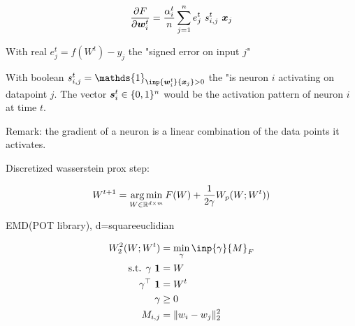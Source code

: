 \begin{equation}
	\frac{\partial F}{\partial {\bm{w}}^t_i} = \frac{\alpha^t_i}{n} \sum_{j=1}^{n} e^t_j ~ s^t_{i, j} ~ {\bm{x}}_j
\end{equation}

With real $e^t_j = f(W^t) - y_j$ the "signed error on input $j$"

With boolean $s^t_{i, j} = \mathds{1}_{\inp{\vw^t_i}{\vx_j} > 0}$ the "is neuron $i$ activating on datapoint $j$. The vector ${\bm{s}}^t_{i} \in \{0, 1\}^n$ would be the activation pattern of neuron $i$ at time $t$.

Remark: the gradient of a neuron is a linear combination of the data points it activates.

Discretized wasserstein prox step:

\begin{equation}
	W^{t+1} = \operatorname*{arg\,min}_{W \in \mathbb{R}^{d \times m}} F(W) + \frac{1}{2 \gamma} W_p(W; W^t))
\end{equation}


EMD(POT library), d=squareeuclidian

\begin{align}
	W_2^2(W; W^t) &= \min_{\gamma} \inp{\gamma}{M}_F \\
	\text{s.t.  } \gamma ~ \mathbf{1} &= W \\
	\gamma^\top ~ \mathbf{1} &= W^t \\
	\gamma &\geq 0 \\
	M_{i, j} &= \lVert w_i - w_j \rVert^2_2
\end{align}

